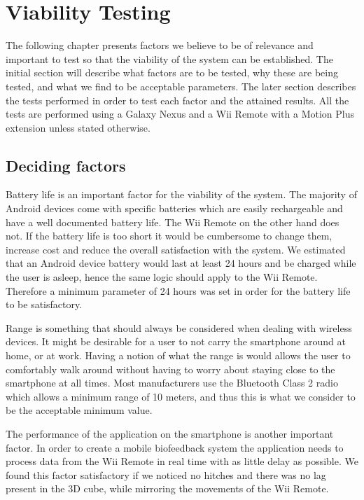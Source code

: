\chapter{Viability Testing}
The following chapter presents factors we believe to be of relevance and important to test so that the viability of the system can be established. The initial section will describe what factors are to be tested, why these are being tested, and what we find to be acceptable parameters. The later section describes the tests performed in order to test each factor and the attained results. All the tests are performed using a Galaxy Nexus \cite{galaxyNexus} and a Wii Remote with a Motion Plus extension unless stated otherwise.

\section{Deciding factors}
Battery life is an important factor for the viability of the system. The majority of Android devices come with specific batteries which are easily rechargeable and have a well documented battery life. The Wii Remote on the other hand does not. If the battery life is too short it would be cumbersome to change them, increase cost and reduce the overall satisfaction with the system. We estimated that an Android device battery would last at least 24 hours and be charged while the user is asleep, hence the same logic should apply to the Wii Remote. Therefore a minimum parameter of 24 hours was set in order for the battery life to be satisfactory.

Range is something that should always be considered when dealing with wireless devices. It might be desirable for a user to not carry the smartphone around at home, or at work. Having a notion of what the range is would allows the user to comfortably walk around without having to worry about staying close to the smartphone at all times. Most manufacturers use the Bluetooth Class 2 radio which allows a minimum range of 10 meters, and thus this is what we consider to be the acceptable minimum value.

The performance of the application on the smartphone is another important factor. In order to create a mobile biofeedback system the application needs to process data from the Wii Remote in real time with as little delay as possible. We found this factor satisfactory if we noticed no hitches and there was no lag present in the 3D cube, while mirroring the movements of the Wii Remote.

